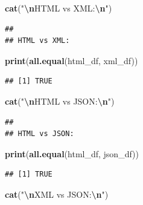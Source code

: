 \documentclass[
]{article}
\newenvironment{Shaded}{\begin{snugshade}}{\end{snugshade}}
\newcommand{\FunctionTok}[1]{\textcolor[rgb]{0.13,0.29,0.53}{\textbf{#1}}}
\newcommand{\NormalTok}[1]{#1}
\newcommand{\SpecialCharTok}[1]{\textcolor[rgb]{0.81,0.36,0.00}{\textbf{#1}}}
\newcommand{\StringTok}[1]{\textcolor[rgb]{0.31,0.60,0.02}{#1}}
\begin{document}
\begin{Shaded}
\begin{Highlighting}[]
\FunctionTok{cat}\NormalTok{(}\StringTok{"}\SpecialCharTok{\textbackslash{}n}\StringTok{HTML vs XML:}\SpecialCharTok{\textbackslash{}n}\StringTok{"}\NormalTok{)}
\end{Highlighting}
\end{Shaded}

\begin{verbatim}
## 
## HTML vs XML:
\end{verbatim}

\begin{Shaded}
\begin{Highlighting}[]
\FunctionTok{print}\NormalTok{(}\FunctionTok{all.equal}\NormalTok{(html\_df, xml\_df))}
\end{Highlighting}
\end{Shaded}

\begin{verbatim}
## [1] TRUE
\end{verbatim}

\begin{Shaded}
\begin{Highlighting}[]
\FunctionTok{cat}\NormalTok{(}\StringTok{"}\SpecialCharTok{\textbackslash{}n}\StringTok{HTML vs JSON:}\SpecialCharTok{\textbackslash{}n}\StringTok{"}\NormalTok{)}
\end{Highlighting}
\end{Shaded}

\begin{verbatim}
## 
## HTML vs JSON:
\end{verbatim}

\begin{Shaded}
\begin{Highlighting}[]
\FunctionTok{print}\NormalTok{(}\FunctionTok{all.equal}\NormalTok{(html\_df, json\_df))}
\end{Highlighting}
\end{Shaded}

\begin{verbatim}
## [1] TRUE
\end{verbatim}

\begin{Shaded}
\begin{Highlighting}[]
\FunctionTok{cat}\NormalTok{(}\StringTok{"}\SpecialCharTok{\textbackslash{}n}\StringTok{XML vs JSON:}\SpecialCharTok{\textbackslash{}n}\StringTok{"}\NormalTok{)}
\end{Highlighting}
\end{Shaded}
\end{document}

